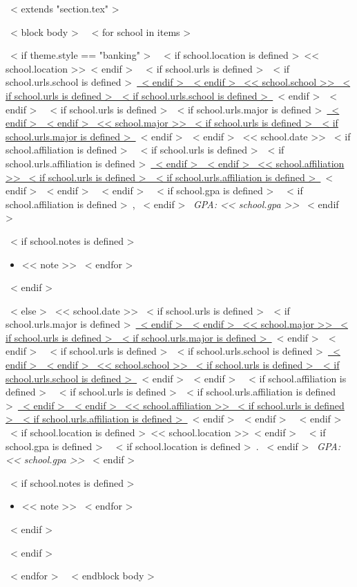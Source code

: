 ~< extends "section.tex" >~

~< block body >~
  ~< for school in items >~
    \begin{samepage}
      \cventry
        ~< if theme.style == "banking" >~
          {~< if school.location is defined >~<< school.location >>~< endif >~}
          {~< if school.urls is defined >~~< if school.urls.school is defined >~\href{<< school.urls.school >>}{~< endif >~~< endif >~%
             << school.school >>%
           ~< if school.urls is defined >~~< if school.urls.school is defined >~}~< endif >~~< endif >~}
          {~< if school.urls is defined >~~< if school.urls.major is defined >~\href{<< school.urls.major >>}{~< endif >~~< endif >~%
             << school.major >>%
           ~< if school.urls is defined >~~< if school.urls.major is defined >~}~< endif >~~< endif >~}
          {<< school.date >>}
          {~< if school.affiliation is defined >~%
             ~< if school.urls is defined >~~< if school.urls.affiliation is defined >~\href{<< school.urls.affiliation >>}{~< endif >~~< endif >~%
               << school.affiliation >>%
             ~< if school.urls is defined >~~< if school.urls.affiliation is defined >~}~< endif >~~< endif >~%
           ~< endif >~%
           ~< if school.gpa is defined >~%
             ~< if school.affiliation is defined >~, ~< endif >~%
             \textit{GPA: << school.gpa >>}%
           ~< endif >~
          }
          {~< if school.notes is defined >~\begin{itemize}
             ~< for note in school.notes >~
               \item{<< note >>}
             ~< endfor >~
           \end{itemize}~< endif >~}
        ~< else >~
          {<< school.date >>}
          {~< if school.urls is defined >~~< if school.urls.major is defined >~\href{<< school.urls.major >>}{~< endif >~~< endif >~%
             << school.major >>%
           ~< if school.urls is defined >~~< if school.urls.major is defined >~}~< endif >~~< endif >~}
          {~< if school.urls is defined >~~< if school.urls.school is defined >~\href{<< school.urls.school >>}{~< endif >~~< endif >~%
             << school.school >>%
           ~< if school.urls is defined >~~< if school.urls.school is defined >~}~< endif >~~< endif >~}
          {~< if school.affiliation is defined >~%
             ~< if school.urls is defined >~~< if school.urls.affiliation is defined >~\href{<< school.urls.affiliation >>}{~< endif >~~< endif >~%
               << school.affiliation >>%
             ~< if school.urls is defined >~~< if school.urls.affiliation is defined >~}~< endif >~~< endif >~%
           ~< endif >~}
          {~< if school.location is defined >~<< school.location >>~< endif >~%
           ~< if school.gpa is defined >~%
             ~< if school.location is defined >~. ~< endif >~%
             \textit{GPA: << school.gpa >>}%
           ~< endif >~}
          {~< if school.notes is defined >~\begin{itemize}
             ~< for note in school.notes >~
               \item{<< note >>}
             ~< endfor >~
           \end{itemize}~< endif >~}
        ~< endif >~
    \end{samepage}
  ~< endfor >~
~< endblock body >~
